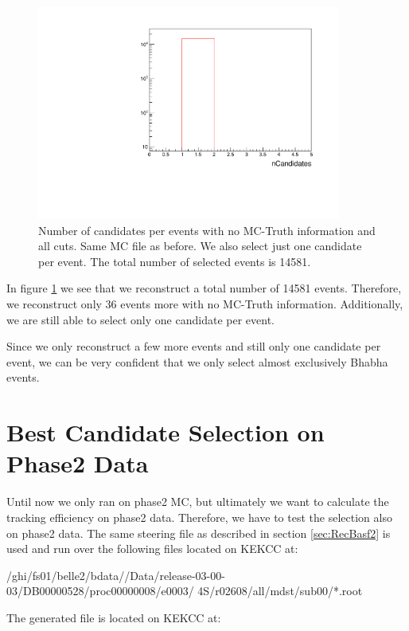 \documentclass[a4paper,11pt,twosided,final,german,openbib,pdftex,listof=totoc,bibliography=totoc]{scrbook}
\begin{document}
\begin{figure}[h!]
	\centering
	\includegraphics[width=10cm]{Cuts/nCandNoMCInfo.pdf}
	\caption[Number Of Candidates Per Event With No MC-Truth Info (All Cuts)]{Number of candidates per events with no MC-Truth information and all cuts. Same MC file as before. We also select just one candidate per event. The total number of selected events is 14581.}
	\label{fig:nCandNoMCInfo}
\end{figure}

In figure \ref{fig:nCandNoMCInfo} we see that we reconstruct a total number of 14581 events. Therefore, we reconstruct only 36 events more with no MC-Truth information. Additionally, we are still able to select only one candidate per event. 

Since we only reconstruct a few more events and still only one candidate per event, we can be very confident that we only select almost exclusively Bhabha events.

\section{Best Candidate Selection on Phase2 Data}
\label{sec:SelectingBhabhaData}

Until now we only ran on phase2 MC, but ultimately we want to calculate the tracking efficiency on phase2 data. Therefore, we have to test the selection also on phase2 data. The same steering file as described in section \ref{sec:RecBasf2} is used and run over the following files located on KEKCC at:
\newline

/ghi/fs01/belle2/bdata//Data/release-03-00-03/DB00000528/proc00000008/e0003/
4S/r02608/all/mdst/sub00/*.root
\newline

The generated file is located on KEKCC at:
\newline
\end{document}
